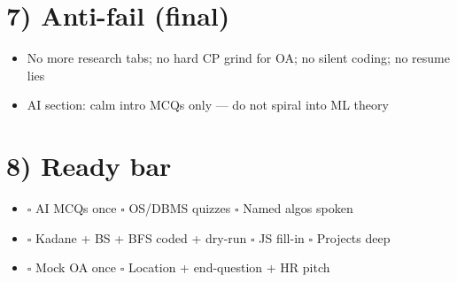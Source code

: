 \documentclass[a4paper,9pt]{extarticle}
\begin{document}
\section{7) Anti-fail (final)}
\begin{itemize}
  \item No more research tabs; no hard CP grind for OA; no silent coding; no resume lies
  \item AI section: calm intro MCQs only --- do not spiral into ML theory
\end{itemize}

\section{8) Ready bar}
\begin{itemize}
  \item $\square$ AI MCQs once \quad $\square$ OS/DBMS quizzes \quad $\square$ Named algos spoken
  \item $\square$ Kadane + BS + BFS coded + dry-run \quad $\square$ JS fill-in \quad $\square$ Projects deep
  \item $\square$ Mock OA once \quad $\square$ Location + end-question + HR pitch
\end{itemize}

\vspace{1mm}
\end{document}
